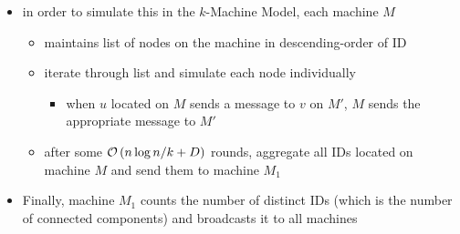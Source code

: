 \begin{frame}
{
    }
\end{frame}

\begin{frame}
    \begin{itemize}
        \item in order to simulate this in the $k$-Machine Model, each machine $M$
              \begin{itemize}
                  \item maintains list of nodes on the machine in descending-order of ID
                  \item iterate through list and simulate each node individually
                        \begin{itemize}
                            \item when $u$ located on $M$ sends a message to $v$ on $M'$, $M$ sends the appropriate message to $M'$
                        \end{itemize}
                  \item after some $\mathcal{O}\left(n\log{n} / k + D\right)$ rounds,
                        aggregate all IDs located on machine $M$ and send them to
                        machine $M_1$
              \end{itemize}
        \item Finally, machine $M_1$ counts the number of distinct IDs (which is the number of connected components) and broadcasts it to all machines
    \end{itemize}
\end{frame}

